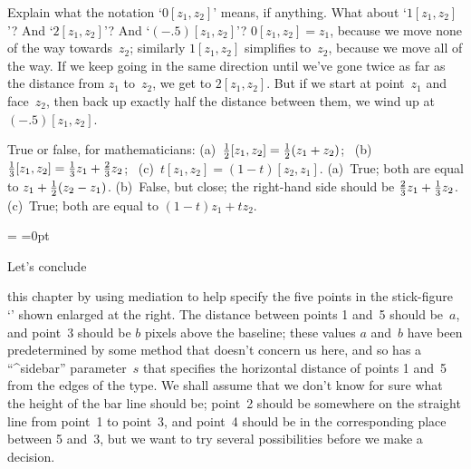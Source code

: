\exercise Explain what the notation `$0[z_1,z_2]$' means, if anything.
What about `$1[z_1,z_2]$'? And `$2[z_1,z_2]$'? And `$(-.5)[z_1,z_2]$'?
\answer $0[z_1,z_2]=z_1$, because we move none of the way towards~$z_2$;
similarly $1[z_1,z_2]$ simplifies to~$z_2$, because we move all of the
way.  If we keep going in the same direction until we've gone twice as far
as the distance from $z_1$ to~$z_2$, we get to $2[z_1,z_2]$. But if we
start at point~$z_1$ and face~$z_2$, then back up exactly half the distance
between them, we wind up at $(-.5)[z_1,z_2]$.

\exercise True or false, for mathematicians: (a)~${1\over2}[z_1,z_2]=
{1\over2}(z_1+z_2)$; \ (b)~${1\over3}[z_1,z_2]={1\over3}z_1+{2\over3}z_2$;
\ (c)~$t[z_1,z_2]=(1-t)[z_2,z_1]$.
\answer (a)~True; both are equal to $z_1+{1\over2}(z_2-z_1)$.
(b)~False, but close; the right-hand side should be
${2\over3}z_1+{1\over3}z_2$.  (c)~True; both are equal to $(1-t)z_1+tz_2$.

=
=0pt

\apspix {}
Let's conclude \strut{}%
this chapter by using mediation
to help specify the five points in the stick-figure `{\manual\Aa}'
shown enlarged at the right. The distance between points 1 and~5
should be~$a$, and point~3 should be $b$ pixels above the baseline;
these values $a$ and~$b$ have been predetermined by some method
that doesn't concern us here, and so has a ``^{sidebar}'' parameter~$s$
that specifies the horizontal distance of points 1 and~5 from the
edges of the type. We shall assume that we don't know for sure what
the height of the bar line should be; point~2 should be somewhere on the
straight line from point~1 to point~3, and point~4 should be in the
corresponding place between 5 and~3, but we want to try several
possibilities before we make a decision.

